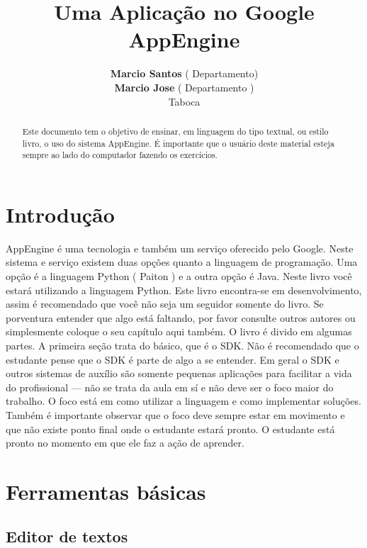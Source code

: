 \documentclass[a4paper]{article}
\title{Uma Aplicação no Google AppEngine}
\author{\textbf{Marcio Santos} ( Departamento)\\
        \textbf{Marcio Jose} ( Departamento )\\
        Taboca}
\begin{document}
\maketitle
\begin{abstract}
Este documento tem o objetivo de ensinar, em linguagem do tipo textual, ou estilo livro, o uso do sistema AppEngine. É importante que o usuário deste material esteja sempre ao lado do computador fazendo os exercícios. 
\end{abstract}
\tableofcontents



\section{Introdu\c{c}\~{a}o}

AppEngine é uma tecnologia e também um serviço oferecido pelo Google. Neste sistema e serviço existem duas opções quanto a linguagem de programação. Uma opção é a linguagem Python ( Paiton ) e a outra opção é Java. Neste livro você estará utilizando a linguagem Python. Este livro encontra-se em desenvolvimento, assim é recomendado que você não seja um seguidor somente do livro. Se porventura entender que algo está faltando, por favor consulte outros autores ou simplesmente coloque o seu capítulo aqui também. O livro é divido em algumas partes. A primeira seção trata do básico, que é o SDK. Não é recomendado que o estudante pense que o SDK é parte de algo a se entender. Em geral o SDK e outros sistemas de auxílio são somente pequenas aplicações para facilitar a vida do profissional --- não se trata da aula em sí e não deve ser o foco maior do trabalho. O foco está em como utilizar a linguagem e como implementar soluções. Também é importante observar que o foco deve sempre estar em movimento e que não existe ponto final onde o estudante estará  pronto. O estudante está pronto no momento em  que ele faz a ação de aprender.


\section{Ferramentas básicas}

\subsection{Editor de textos}
\end{document}
